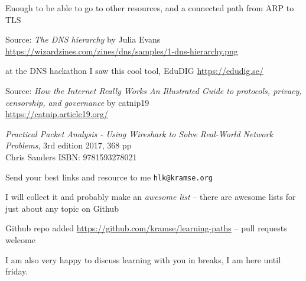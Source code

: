 \documentclass[Screen16to9,17pt]{foils}
\begin{document}
Enough to be able to go to other resources, and a connected path from ARP to TLS





{\small Source: \emph{The DNS hierarchy} by Julia Evans}\\
\url{https://wizardzines.com/zines/dns/samples/1-dns-hierarchy.png} {\color{red}\faHeart}



\begin{list2}
\item at the DNS hackathon I saw this cool tool, EduDIG \url{https://edudig.se/} {\color{red}\faHeart}
\end{list2}



{\small Source: \emph{How the Internet Really Works
An Illustrated Guide to protocols, privacy, censorship, and governance} by catnip19}\\
\url{https://catnip.article19.org/} {\color{red}\faHeart}




\begin{list2}
\item \emph{Practical Packet Analysis - Using Wireshark to Solve Real-World Network Problems}, 3rd edition 2017, 368 pp\\
Chris Sanders ISBN: 9781593278021
\end{list2}


\begin{list2}
\item Send your best links and resource to me \verb+hlk@kramse.org+
\item I will collect it and probably make an \emph{awesome list} -- there are awesome lists for just about any topic on Github
\item Github repo added \url{https://github.com/kramse/learning-paths} -- pull requests welcome
\end{list2}

I am also very happy to discuss learning with you in breaks, I am here until friday.
\end{document}

